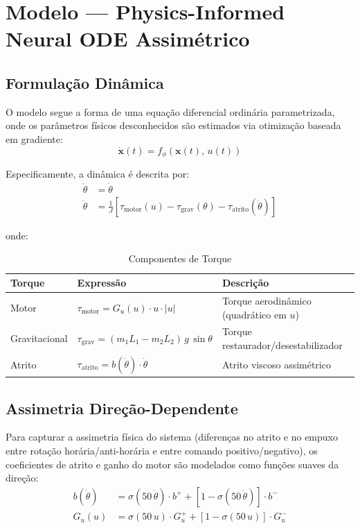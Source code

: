 \documentclass[11pt,a4paper]{article}
\begin{document}
\section{Modelo — Physics-Informed Neural ODE Assimétrico}

\subsection{Formulação Dinâmica}

O modelo segue a forma de uma equação diferencial ordinária parametrizada, onde os parâmetros físicos desconhecidos são estimados via otimização baseada em gradiente:
%
\begin{equation}
\dot{\mathbf{x}}(t) = f_\phi(\mathbf{x}(t),\, u(t))
\end{equation}

Especificamente, a dinâmica é descrita por:
%
\begin{align}
\dot{\theta} &= \dot{\theta} \\
\ddot{\theta} &= \frac{1}{J} \left[ \tau_{\text{motor}}(u) - \tau_{\text{grav}}(\theta) - \tau_{\text{atrito}}(\dot{\theta}) \right]
\end{align}

onde:

\begin{table}[hbt!]
\centering
\caption{Componentes de Torque}
\vspace{0.2cm}
\begin{tabular}{lll}
\toprule
\textbf{Torque} & \textbf{Expressão} & \textbf{Descrição} \\
\midrule
Motor & $\tau_{\text{motor}} = G_u(u) \cdot u \cdot |u|$ & Torque aerodinâmico (quadrático em $u$) \\
Gravitacional & $\tau_{\text{grav}} = (m_1 L_1 - m_2 L_2)\, g\, \sin\theta$ & Torque restaurador/desestabilizador \\
Atrito & $\tau_{\text{atrito}} = b(\dot{\theta}) \cdot \dot{\theta}$ & Atrito viscoso assimétrico \\
\bottomrule
\end{tabular}
\end{table}

\subsection{Assimetria Direção-Dependente}

Para capturar a assimetria física do sistema (diferenças no atrito e no empuxo entre rotação horária/anti-horária e entre comando positivo/negativo), os coeficientes de atrito e ganho do motor são modelados como funções suaves da direção:
%
\begin{align}
b(\dot{\theta}) &= \sigma(50\,\dot{\theta}) \cdot b^+ + \left[1 - \sigma(50\,\dot{\theta})\right] \cdot b^- \\
G_u(u) &= \sigma(50\,u) \cdot G_u^+ + \left[1 - \sigma(50\,u)\right] \cdot G_u^-
\end{align}
\end{document}
